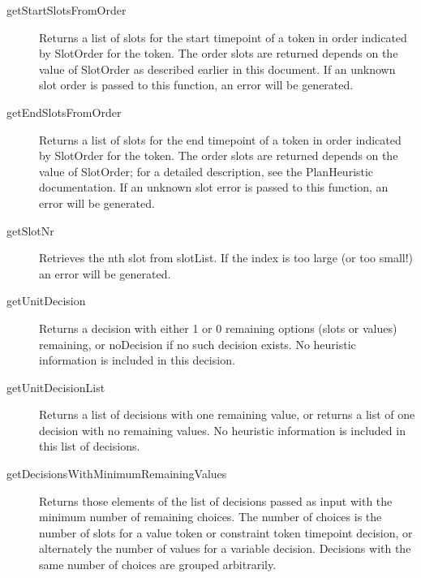 \begin{description}
\item[getStartSlotsFromOrder]        
        Returns a list of slots for the start timepoint of a token in order indicated by SlotOrder for the token.
        The order slots are returned depends on the value of SlotOrder as described earlier in this document.  
        If an unknown slot order is passed to this function, an error will be generated.
        

\item[getEndSlotsFromOrder]        
        Returns a list of slots for the end timepoint of a token in order indicated by SlotOrder for the token.  
        The order slots are returned depends on the value of SlotOrder;
        for a detailed description, see the PlanHeuristic documentation.  If an unknown slot error
        is passed to this function, an error will be generated.
        

\item[getSlotNr]        
        Retrieves the nth slot from slotList.  If the index is too large (or too small!) an error will be
        generated.
       

\item[getUnitDecision]
        Returns a decision with either 1 or 0 remaining options (slots or values) remaining, or
        noDecision if no such decision exists.  No heuristic information is included in this decision.
        

\item[getUnitDecisionList]        
        Returns a list of decisions with one remaining value, or returns a list of one decision
        with no remaining values.  No heuristic information is included in this list of decisions.
        

\item[getDecisionsWithMinimumRemainingValues]        
        Returns those elements of the list of decisions passed as input with the minimum number
        of remaining choices.  The number of choices is the number of slots for a value token
        or constraint token timepoint decision, or alternately the number of values for a variable
        decision.  Decisions with the same number of choices are grouped arbitrarily.
        
\end{description}

